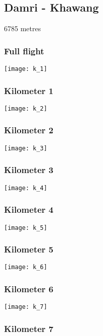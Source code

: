 \documentclass[]{article}
\begin{document}
\newpage

\subsection{Damri - Khawang}\label{damri---khawang}

6785 metres

\subsubsection{Full flight}\label{full-flight-10}

\texttt{[image: k\_1]}

\subsubsection{Kilometer 1}\label{kilometer-1-10}

\texttt{[image: k\_2]}

\subsubsection{Kilometer 2}\label{kilometer-2-10}

\texttt{[image: k\_3]}

\subsubsection{Kilometer 3}\label{kilometer-3-10}

\texttt{[image: k\_4]}

\subsubsection{Kilometer 4}\label{kilometer-4-10}

\texttt{[image: k\_5]}

\subsubsection{Kilometer 5}\label{kilometer-5-10}

\texttt{[image: k\_6]}

\subsubsection{Kilometer 6}\label{kilometer-6-7}

\texttt{[image: k\_7]}

\subsubsection{Kilometer 7}\label{kilometer-7-5}
\end{document}
